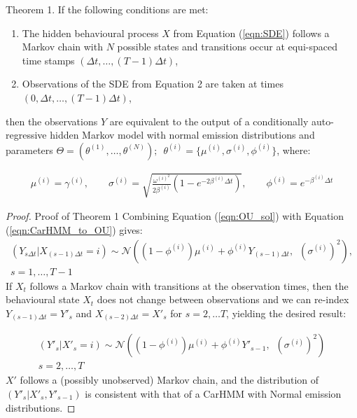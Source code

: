 \begin{theorem}{Theorem 1.}{}%
If the following conditions are met:
\begin{enumerate}
    \item The hidden behavioural process $X$ from Equation (\ref{eqn:SDE}) follows a Markov chain with $N$ possible states and transitions occur at equi-spaced time stamps $\left(\Delta t, \ldots, (T-1)\Delta t\right)$,
    
    \item Observations of the SDE from Equation 2 are taken at times $\left(0, \Delta t, \ldots, (T-1)\Delta t\right)$,
\end{enumerate}
then the observations $Y$ are equivalent to the output of a conditionally auto-regressive hidden Markov model with normal emission distributions and parameters $\Theta = (\theta^{(1)}, \ldots, \theta^{(N)}); \enspace \theta^{(i)} = \{\mu^{(i)},\sigma^{(i)},\phi^{(i)}\}$, where:

\begin{align}
\mu^{(i)} = \gamma^{(i)}, \qquad \sigma^{(i)} = \sqrt{\frac{\omega^{(i)^2}}{2\beta^{(i)}} (1-e^{-2\beta^{(i)}\Delta t})}, \qquad \phi^{(i)} = e^{-\beta^{(i)}\Delta t} \label{eqn:CarHMM_to_OU}
\end{align}

\end{theorem}

\begin{proof}{Proof of Theorem 1}{}
Combining Equation (\ref{eqn:OU_sol}) with Equation (\ref{eqn:CarHMM_to_OU}) gives:
%
\begin{align*}
\left(Y_{s \Delta t} | X_{(s-1)\Delta t} = i \right) \sim \mathcal{N}\left((1-\phi^{(i)}) \mu^{(i)} + \phi^{(i)} Y_{(s-1) \Delta t}, \enspace \left(\sigma^{(i)}\right)^2 \right),\\
s = 1, \ldots, T-1
\end{align*}
%
If $X_t$ follows a Markov chain with transitions at the observation times, then the behavioural state $X_t$ does not change between observations and we can re-index $Y_{(s-1) \Delta t} = Y'_s$ and $X_{(s-2)\Delta t} = X'_s$ for $s = 2,\ldots T$, yielding the desired result:

\begin{align*}
\left(Y'_s| X'_s = i \right) \sim \mathcal{N}\left((1-\phi^{(i)}) \mu^{(i)} + \phi^{(i)} Y'_{s-1}, \enspace \left(\sigma^{(i)}\right)^2 \right)\\
s = 2, \ldots, T
\end{align*}
%
$X'$ follows a (possibly unobserved) Markov chain, and the distribution of $(Y'_s|X'_s,Y'_{s-1})$ is consistent with that of a CarHMM with Normal emission distributions.
\end{proof}

